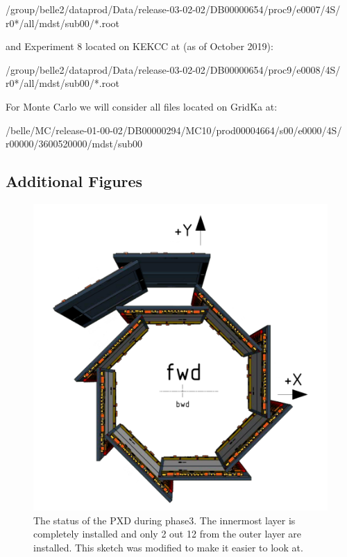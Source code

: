 \documentclass[a4paper,11pt,twosided,final,german,openbib,pdftex,listof=totoc,bibliography=totoc]{scrbook}
\begin{document}
\begin{appendix}
/group/belle2/dataprod/Data/release-03-02-02/DB00000654/proc9/e0007/4S/
r0*/all/mdst/sub00/*.root
\newline 

and Experiment 8 located on KEKCC at (as of October 2019):
\newline

/group/belle2/dataprod/Data/release-03-02-02/DB00000654/proc9/e0008/4S/
r0*/all/mdst/sub00/*.root
\newline

For Monte Carlo we will consider all files located on GridKa at:
\newline 

/belle/MC/release-01-00-02/DB00000294/MC10/prod00004664/s00/e0000/4S/
r00000/3600520000/mdst/sub00
\newline

\clearpage
\subsection{Additional Figures}



\begin{figure}[h!]
	\centering
	\includegraphics[width=\textwidth]{Bilder/phase3pxd.pdf}
	\caption[The Status Of The PXD In Phase3]{The status of the PXD during phase3. The innermost layer is completely installed and only 2 out 12 from the outer layer are installed. This sketch was modified to make it easier to look at.\cite{phase3pxd}}
	\label{fig:phase3pxd}
\end{figure}










\end{appendix}
\end{document}
